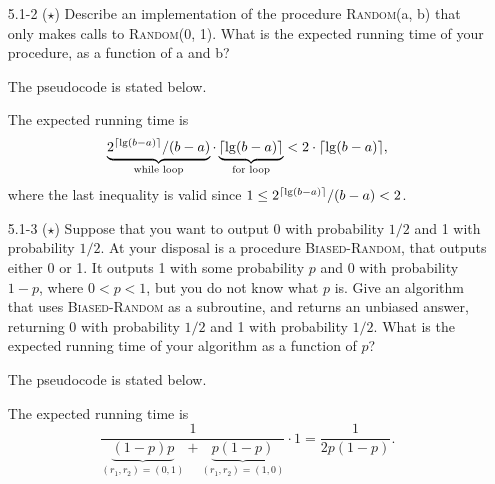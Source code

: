 \begin{enumerate}
\item[5.1{-}2]{($\star$) Describe an implementation of the procedure \textsc{Random}(a, b)
that only makes calls to \textsc{Random}(0, 1). What is the expected running
time of your procedure, as a function of a and b?}

\begin{framed}
The pseudocode is stated below.\\
\begin{algorithm}[H]
\SetAlgoNoEnd\DontPrintSemicolon
\BlankLine
{}
\end{algorithm}

The expected running time is
\[
  \underbrace{2^{\lceil\lg(b - a)\rceil}/(b - a)}_\text{while loop} \cdot \underbrace{\lceil\lg(b - a)\rceil}_\text{for loop} < 2 \cdot \lceil\lg(b - a)\rceil,
\]
where the last inequality is valid since $1 \le 2^{\lceil\lg(b - a)\rceil}/(b - a) < 2$.
\end{framed}

\item[5.1{-}3]{($\star$) Suppose that you want to output 0 with probability
$1/2$ and 1 with probability $1/2$.  At your disposal is a procedure
\textsc{Biased-Random}, that outputs either 0 or 1. It outputs 1 with some
probability $p$ and 0 with probability $1 - p$, where $0 < p < 1$, but you do
not know what $p$ is. Give an algorithm that uses \textsc{Biased-Random} as
a subroutine, and returns an unbiased answer, returning 0 with probability $1/2$
and 1 with probability $1/2$. What is the expected running time of your
algorithm as a function of $p$?}

\begin{framed}
The pseudocode is stated below.\\
\begin{algorithm}[H]
\SetAlgoNoEnd\DontPrintSemicolon
\BlankLine
{}
\end{algorithm}

The expected running time is
\[
  \frac{1}{\underbrace{(1 - p) p}_\text{$(r_1, r_2) = (0, 1)$} + \underbrace{p (1 - p)}_\text{$(r_1, r_2) = (1, 0)$}} \cdot 1 = \frac{1}{2p (1- p)}.
\]
\end{framed}

\end{enumerate}

